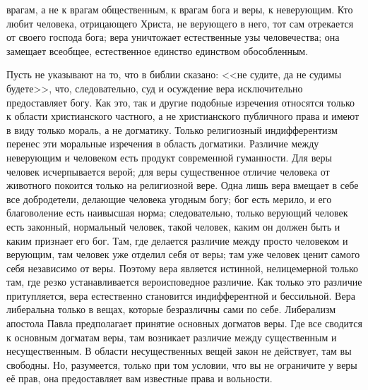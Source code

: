 \documentclass[12pt,oneside]{book}
\begin{document}
врагам, а не к врагам общественным, к врагам бога и веры, к неверующим. Кто любит человека, отрицающего Христа, не верующего в него, тот сам отрекается от своего господа бога; вера уничтожает естественные узы человечества; она замещает всеобщее, естественное единство единством обособленным.







Пусть не указывают на то, что в библии сказано: <<не судите, да не судимы будете>>, что, следовательно, суд и осуждение вера исключительно предоставляет богу. Как это, так и другие подобные изречения относятся только к области христианского частного, а не христианского публичного права и имеют в виду только мораль, а не догматику. Только религиозный индифферентизм перенес эти моральные изречения в область догматики. Различие между неверующим и человеком есть продукт современной гуманности. Для веры человек исчерпывается верой; для веры существенное отличие человека от животного покоится только на религиозной вере. Одна лишь вера вмещает в себе все добродетели, делающие человека угодным богу; бог есть мерило, и его благоволение есть наивысшая норма; следовательно, только верующий человек есть законный, нормальный человек, такой человек, каким он должен быть и каким признает его бог. Там, где делается различие между просто человеком и верующим, там человек уже отделил себя от веры; там уже человек ценит самого себя независимо от веры. Поэтому вера является истинной, нелицемерной только там, где резко устанавливается вероисповедное различие. Как только это различие притупляется, вера естественно становится индифферентной и бессильной. Вера либеральна только в вещах, которые безразличны сами по себе. Либерализм апостола Павла предполагает принятие основных догматов веры. Где все сводится к основным догматам веры, там возникает различие между существенным и несущественным. В области несущественных вещей закон не действует, там вы свободны. Но, разумеется, только при том условии, что вы не ограничите у веры её прав, она предоставляет вам известные права и вольности.
\end{document}
